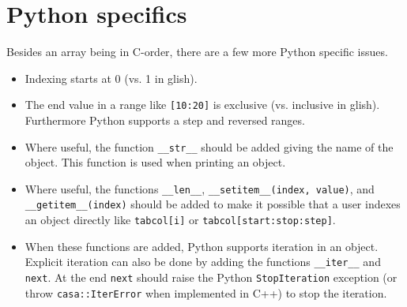 \section{Python specifics}
Besides an array being in C-order, there are a few more Python
specific issues.
\begin{itemize}
\item Indexing starts at 0 (vs. 1 in glish).
\item The end value in a range like \texttt{[10:20]} is exclusive
(vs. inclusive in glish). Furthermore Python supports a step and
reversed ranges.
\item Where useful, the function \texttt{\_\_str\_\_} should be added
  giving the name of the object. This function is used when printing
  an object.
\item Where useful, the functions \texttt{\_\_len\_\_},
\texttt{\_\_setitem\_\_(index, value)}, and 
\texttt{\_\_getitem\_\_(index)} should
be added to make it possible that a user indexes an object directly like
\texttt{tabcol[i]} or \texttt{tabcol[start:stop:step]}.
\item When these functions are added, Python supports iteration in an
object. Explicit iteration can also be done by adding the functions
\texttt{\_\_iter\_\_} and \texttt{next}. At the end \texttt{next}
should raise the Python \texttt{StopIteration} exception
(or throw \texttt{casa::IterError}
when implemented in C++) to stop the iteration.
\end{itemize}

